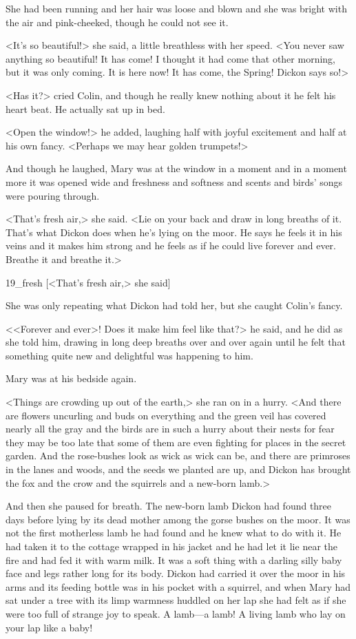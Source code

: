 She had been running and her hair was loose and blown and she was bright with the air and pink-cheeked, though he could not see it.

<It's so beautiful!> she said, a little breathless with her speed. <You never saw anything so beautiful! It has come! I thought it had come that other morning, but it was only coming. It is here now! It has come, the Spring! Dickon says so!>

<Has it?> cried Colin, and though he really knew nothing about it he felt his heart beat. He actually sat up in bed.

<Open the window!> he added, laughing half with joyful excitement and half at his own fancy. <Perhaps we may hear golden trumpets!>

And though he laughed, Mary was at the window in a moment and in a moment more it was opened wide and freshness and softness and scents and birds' songs were pouring through.

<That's fresh air,> she said. <Lie on your back and draw in long breaths of it. That's what Dickon does when he's lying on the moor. He says he feels it in his veins and it makes him strong and he feels as if he could live forever and ever. Breathe it and breathe it.>

\begin{colorbigpic}
	[\basicscale]
	{19_fresh}
	[<That's fresh air,> she said]
\end{colorbigpic}

She was only repeating what Dickon had told her, but she caught Colin's fancy.

<<Forever and ever>! Does it make him feel like that?> he said, and he did as she told him, drawing in long deep breaths over and over again until he felt that something quite new and delightful was happening to him.

Mary was at his bedside again.

<Things are crowding up out of the earth,> she ran on in a hurry. <And there are flowers uncurling and buds on everything and the green veil has covered nearly all the gray and the birds are in such a hurry about their nests for fear they may be too late that some of them are even fighting for places in the secret garden. And the rose-bushes look as wick as wick can be, and there are primroses in the lanes and woods, and the seeds we planted are up, and Dickon has brought the fox and the crow and the squirrels and a new-born lamb.>

And then she paused for breath. The new-born lamb Dickon had found three days before lying by its dead mother among the gorse bushes on the moor. It was not the first motherless lamb he had found and he knew what to do with it. He had taken it to the cottage wrapped in his jacket and he had let it lie near the fire and had fed it with warm milk. It was a soft thing with a darling silly baby face and legs rather long for its body. Dickon had carried it over the moor in his arms and its feeding bottle was in his pocket with a squirrel, and when Mary had sat under a tree with its limp warmness huddled on her lap she had felt as if she were too full of strange joy to speak. A lamb—a lamb! A living lamb who lay on your lap like a baby!

